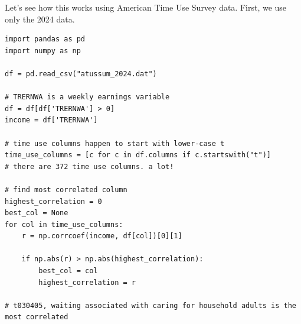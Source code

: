Let's see how this works using American Time Use Survey data. First, we use only the 2024 data. 

\begin{lstlisting}
import pandas as pd
import numpy as np

df = pd.read_csv("atussum_2024.dat")

# TRERNWA is a weekly earnings variable
df = df[df['TRERNWA'] > 0]
income = df['TRERNWA']

# time use columns happen to start with lower-case t
time_use_columns = [c for c in df.columns if c.startswith("t")]
# there are 372 time use columns. a lot!

# find most correlated column
highest_correlation = 0
best_col = None
for col in time_use_columns:
    r = np.corrcoef(income, df[col])[0][1]
    
    if np.abs(r) > np.abs(highest_correlation):
        best_col = col
        highest_correlation = r

# t030405, waiting associated with caring for household adults is the most correlated    
\end{lstlisting}


